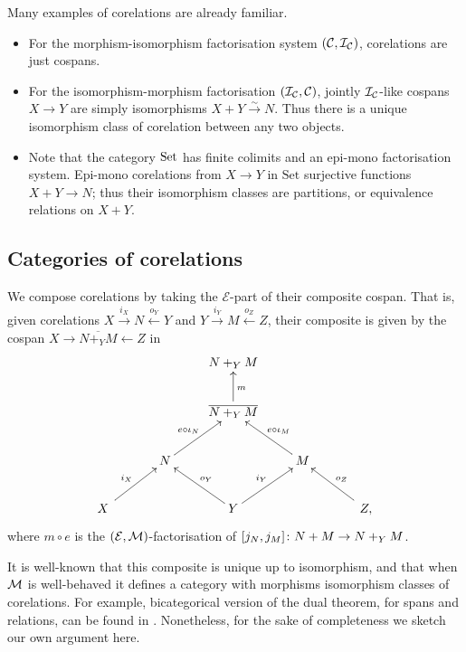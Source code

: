 \begin{examples} \label{ex.corels}
  Many examples of corelations are already familiar.
  \begin{itemize}
    \item For the morphism-isomorphism factorisation system $(\mathcal C,\mathcal I_{\mathcal
      C})$, corelations are just cospans.
    \item For the isomorphism-morphism factorisation $(\mathcal I_{\mathcal C}, \mathcal C)$,
      jointly $\mathcal I_{\mathcal C}$-like cospans $X \to Y$ are simply isomorphisms
      $X+Y \stackrel\sim\to N$. Thus there is a unique isomorphism class of
      corelation between any two objects.
    \item Note that the category $\mathrm{Set}$ has finite colimits and an epi-mono
      factorisation system. Epi-mono corelations from $X \to Y$ in $\mathrm{Set}$
      surjective functions $X+Y \to N$; thus their isomorphism classes are
      partitions, or equivalence relations on $X+Y$. 
  \end{itemize}
\end{examples}

\subsection{Categories of corelations}

We compose corelations by taking the $\mathcal E$-part of their composite
cospan. That is, given corelations $X \stackrel{i_X}{\longrightarrow} N
\stackrel{o_Y}{\longleftarrow} Y$ and $Y \stackrel{i_Y}{\longrightarrow} M
\stackrel{o_Z}{\longleftarrow} Z$, their composite is given by the cospan $X
\to \overline{N+_YM} \leftarrow Z$ in
\[
  \xymatrix{
    && N+_YM \\
    && \overline{N+_YM} \ar[u]_{m} \\
    & N \ar[ur]^{e \circ \iota_N} && M \ar[ul]_{e \circ \iota_M} \\
    \quad X \quad \ar[ur]^{i_X} && Y \ar[ul]_{o_Y} \ar[ur]^{i_Y} && \quad Z, \quad \ar[ul]_{o_Z}
  }
\]
where $m \circ e$ is the $(\mathcal E,\mathcal M)$-factorisation of $[j_N,j_M]{\colon} N+M
\to N+_YM$. 

It is well-known that this composite is unique up to isomorphism, and that when
$\mathcal M$ is well-behaved it defines a category with morphisms isomorphism classes
of corelations. For example, bicategorical version of the dual theorem, for
spans and relations, can be found in \cite{JW}. Nonetheless, for the sake of
completeness we sketch our own argument here.

